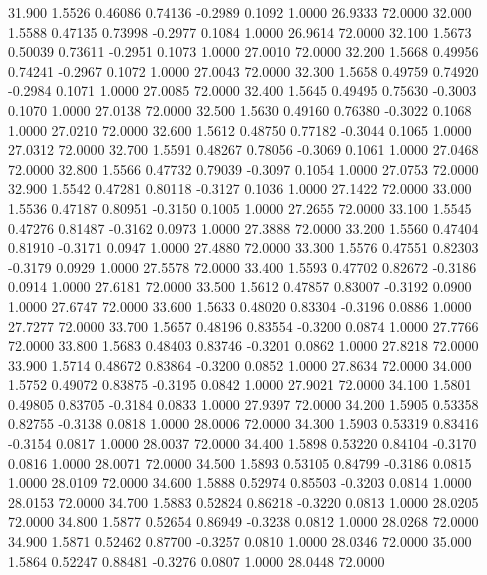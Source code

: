   31.900   1.5526   0.46086   0.74136  -0.2989   0.1092   1.0000  26.9333  72.0000
  32.000   1.5588   0.47135   0.73998  -0.2977   0.1084   1.0000  26.9614  72.0000
  32.100   1.5673   0.50039   0.73611  -0.2951   0.1073   1.0000  27.0010  72.0000
  32.200   1.5668   0.49956   0.74241  -0.2967   0.1072   1.0000  27.0043  72.0000
  32.300   1.5658   0.49759   0.74920  -0.2984   0.1071   1.0000  27.0085  72.0000
  32.400   1.5645   0.49495   0.75630  -0.3003   0.1070   1.0000  27.0138  72.0000
  32.500   1.5630   0.49160   0.76380  -0.3022   0.1068   1.0000  27.0210  72.0000
  32.600   1.5612   0.48750   0.77182  -0.3044   0.1065   1.0000  27.0312  72.0000
  32.700   1.5591   0.48267   0.78056  -0.3069   0.1061   1.0000  27.0468  72.0000
  32.800   1.5566   0.47732   0.79039  -0.3097   0.1054   1.0000  27.0753  72.0000
  32.900   1.5542   0.47281   0.80118  -0.3127   0.1036   1.0000  27.1422  72.0000
  33.000   1.5536   0.47187   0.80951  -0.3150   0.1005   1.0000  27.2655  72.0000
  33.100   1.5545   0.47276   0.81487  -0.3162   0.0973   1.0000  27.3888  72.0000
  33.200   1.5560   0.47404   0.81910  -0.3171   0.0947   1.0000  27.4880  72.0000
  33.300   1.5576   0.47551   0.82303  -0.3179   0.0929   1.0000  27.5578  72.0000
  33.400   1.5593   0.47702   0.82672  -0.3186   0.0914   1.0000  27.6181  72.0000
  33.500   1.5612   0.47857   0.83007  -0.3192   0.0900   1.0000  27.6747  72.0000
  33.600   1.5633   0.48020   0.83304  -0.3196   0.0886   1.0000  27.7277  72.0000
  33.700   1.5657   0.48196   0.83554  -0.3200   0.0874   1.0000  27.7766  72.0000
  33.800   1.5683   0.48403   0.83746  -0.3201   0.0862   1.0000  27.8218  72.0000
  33.900   1.5714   0.48672   0.83864  -0.3200   0.0852   1.0000  27.8634  72.0000
  34.000   1.5752   0.49072   0.83875  -0.3195   0.0842   1.0000  27.9021  72.0000
  34.100   1.5801   0.49805   0.83705  -0.3184   0.0833   1.0000  27.9397  72.0000
  34.200   1.5905   0.53358   0.82755  -0.3138   0.0818   1.0000  28.0006  72.0000
  34.300   1.5903   0.53319   0.83416  -0.3154   0.0817   1.0000  28.0037  72.0000
  34.400   1.5898   0.53220   0.84104  -0.3170   0.0816   1.0000  28.0071  72.0000
  34.500   1.5893   0.53105   0.84799  -0.3186   0.0815   1.0000  28.0109  72.0000
  34.600   1.5888   0.52974   0.85503  -0.3203   0.0814   1.0000  28.0153  72.0000
  34.700   1.5883   0.52824   0.86218  -0.3220   0.0813   1.0000  28.0205  72.0000
  34.800   1.5877   0.52654   0.86949  -0.3238   0.0812   1.0000  28.0268  72.0000
  34.900   1.5871   0.52462   0.87700  -0.3257   0.0810   1.0000  28.0346  72.0000
  35.000   1.5864   0.52247   0.88481  -0.3276   0.0807   1.0000  28.0448  72.0000

